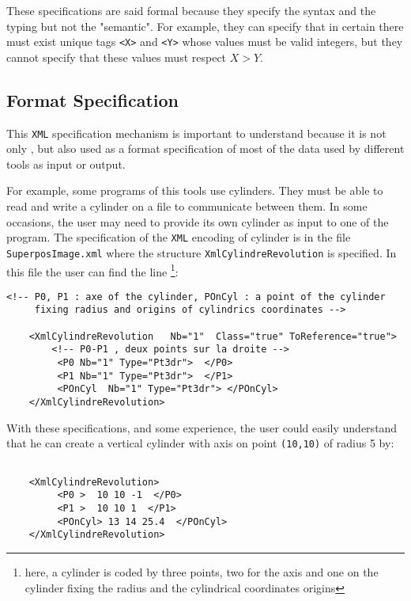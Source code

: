 These  specifications are said formal because they specify the syntax and the 
typing but not the "semantic". For example, they can specify that in certain 
there must exist unique tags {\tt <X>} and {\tt <Y>} whose values must be valid
integers, but they cannot specify that these values must respect $X>Y$.

\subsection{Format Specification}

This {\tt XML} specification mechanism is important to understand because it is not 
only , but also used as a format specification
of most of the data used by different tools as input or output.

For example, some programs of this tools use cylinders. They must
be able to read and write a cylinder on a file to communicate between them.
In some occasions, the user may need to provide its own cylinder as input to one
of the program. The specification of the {\tt XML} encoding of cylinder is
in the file {\tt SuperposImage.xml} where the
structure {\tt XmlCylindreRevolution} is specified. In this file the user can
find the line \footnote{here, a cylinder is coded by three points, two
for the axis and one on the cylinder fixing the radius and the cylindrical coordinates origins}:

\begin{verbatim}
<!-- P0, P1 : axe of the cylinder, POnCyl : a point of the cylinder
     fixing radius and origins of cylindrics coordinates -->

    <XmlCylindreRevolution   Nb="1"  Class="true" ToReference="true">
        <!-- P0-P1 , deux points sur la droite -->
         <P0 Nb="1" Type="Pt3dr">  </P0>
         <P1 Nb="1" Type="Pt3dr">  </P1>
         <POnCyl  Nb="1" Type="Pt3dr"> </POnCyl>
    </XmlCylindreRevolution>
\end{verbatim}

With these specifications, and some experience, the user could easily
understand that he can create a vertical cylinder with axis
on point {\tt (10,10)} of radius 5 by:


\begin{verbatim}

    <XmlCylindreRevolution>
         <P0 >  10 10 -1  </P0>
         <P1 >  10 10 1  </P1>
         <POnCyl> 13 14 25.4  </POnCyl>
    </XmlCylindreRevolution>
\end{verbatim}


